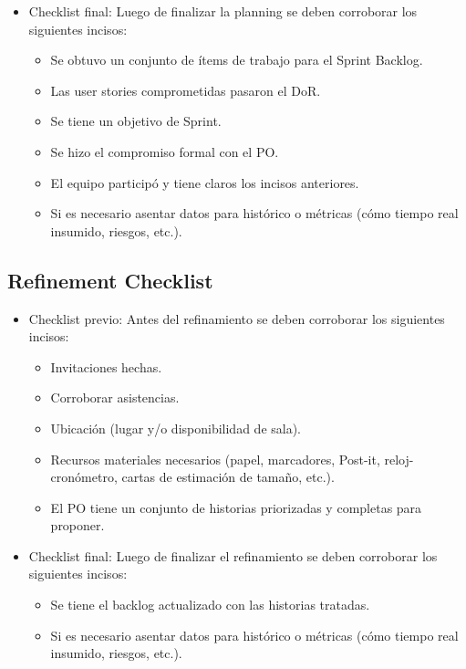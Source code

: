 \begin{itemize}
  \item {Checklist final: Luego de finalizar la planning se deben corroborar los siguientes incisos:
    \begin{itemize}
      \item Se obtuvo un conjunto de ítems de trabajo para el Sprint Backlog.
      \item Las user stories comprometidas pasaron el DoR.
      \item Se tiene un objetivo de Sprint.
      \item Se hizo el compromiso formal con el PO.
      \item El equipo participó y tiene claros los incisos anteriores.
      \item Si es necesario asentar datos para histórico o métricas (cómo tiempo real insumido, riesgos, etc.).   
   \end{itemize}
  }

\end{itemize}


\subsection{Refinement Checklist}

\begin{itemize}
  
  \item {Checklist previo: Antes del refinamiento se deben corroborar los siguientes incisos:
  
  \begin{itemize}
    \item Invitaciones hechas.
    \item Corroborar asistencias.
    \item Ubicación (lugar y/o disponibilidad de sala).
    \item Recursos materiales necesarios (papel, marcadores, Post-it, reloj-cronómetro, cartas de estimación de tamaño, etc.).
    \item El PO tiene un conjunto de historias priorizadas y completas para proponer.
  \end{itemize}
  }
  
  \item {Checklist final: Luego de finalizar el refinamiento se deben corroborar los siguientes incisos:
    \begin{itemize}
      \item Se tiene el backlog actualizado con las historias tratadas.
      \item Si es necesario asentar datos para histórico o métricas (cómo tiempo real insumido, riesgos, etc.).
   \end{itemize}
  }

\end{itemize}

